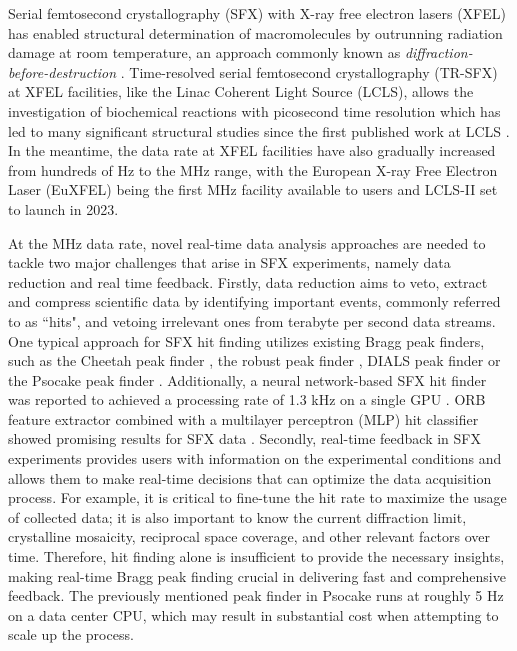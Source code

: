 \documentclass[conference]{IEEEtran}
\newcommand{\psocake}{Psocake}
\begin{document}
Serial femtosecond crystallography (SFX) with X-ray free electron lasers (XFEL)
has enabled structural determination of macromolecules by outrunning radiation
damage at room temperature, an approach commonly known as
\textit{diffraction-before-destruction}
\citep{neutzePotentialBiomolecularImaging2000,
chapmanFemtosecondDiffractiveImaging2006,chapmanFemtosecondXrayProtein2011}.
Time-resolved serial femtosecond crystallography (TR-SFX) at XFEL facilities,
like the Linac Coherent Light Source (LCLS), allows the investigation of
biochemical reactions with picosecond time resolution which has led to many
significant structural studies
\citep{kupitzSerialTimeresolvedCrystallography2014,
nangoThreedimensionalMovieStructural2016,pandeFemtosecondStructuralDynamics2016a,
youngStructurePhotosystemII2016,sugaLightinducedStructuralChanges2017,
kernStructuresIntermediatesKok2018,ibrahimUntanglingSequenceEvents2020,
sugaTimeresolvedStudiesMetalloproteins2020} since the first published work at
LCLS \citep{aquilaTimeresolvedProteinNanocrystallography2012}.  In the meantime,
the data rate at XFEL facilities have also gradually increased from hundreds of
Hz to the MHz range, with the European X-ray Free Electron Laser (EuXFEL) being
the first MHz facility available to users and LCLS-II set to launch in 2023.

At the MHz data rate, novel real-time data analysis approaches are needed to
tackle two major challenges that arise in SFX experiments, namely data reduction
and real time feedback.  Firstly, data reduction aims to veto, extract and
compress scientific data by identifying important events, commonly referred to
as ``hits", and vetoing irrelevant ones from terabyte per second data streams.
One typical approach for SFX hit finding utilizes existing Bragg peak finders,
such as the Cheetah peak finder \citep{bartyCheetahSoftwareHighthroughput2014},
the robust peak finder \citep{hadian-jaziPeakfindingAlgorithmBased2017}, DIALS
peak finder \citep{Winter2018} or the \psocake{} peak finder
\citep{shinDataAnalysisUsing2018}.  Additionally, a neural network-based SFX hit
finder was reported to achieved a processing rate of 1.3 kHz on a single GPU
\citep{keConvolutionalNeuralNetworkbased2018}. ORB feature extractor combined
with a multilayer perceptron (MLP) hit classifier showed promising results for
SFX data \citep{rahmaniDataReductionXray2023}.  Secondly, real-time feedback in
SFX experiments provides users with information on the experimental conditions
and allows them to make real-time decisions that can optimize the data
acquisition process.  For example, it is critical to fine-tune the hit rate to
maximize the usage of collected data;  it is also important to know the current
diffraction limit, crystalline mosaicity, reciprocal space coverage, and other
relevant factors over time.  Therefore, hit finding alone is insufficient to
provide the necessary insights, making real-time Bragg peak finding crucial in
delivering fast and comprehensive feedback.  The previously mentioned peak
finder in \psocake{} runs at roughly 5 Hz on a data center CPU, which may result
in substantial cost when attempting to scale up the process.
\end{document}
